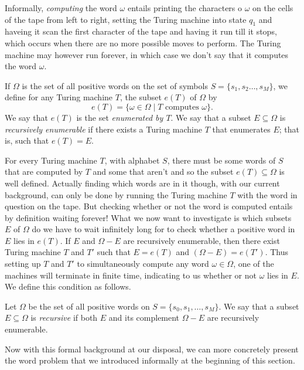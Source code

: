 Informally, \emph{computing} the word $\omega$ entails printing the characters o $\omega$ on the cells of the tape from left to right, setting the Turing machine into state $q_1$ and haveing it scan the first character of the tape and having it run till it stops, which occurs when there are no more possible moves to perform. The Turing machine may however run forever, in which case we don't say that it computes the word $\omega$.

\begin{definition}
  If $\Omega$ is the set of all positive words on the set of symbols $S = \{s_1, s_2 \dots, s_M\}$, we define for any Turing machine $T$, the subset $e(T)$ of $\Omega$ by
  \begin{equation*}
    e(T) = \{\omega \in \Omega \mid T \text{ computes } \omega\}.
  \end{equation*}
  We say that $e(T)$ is the set \emph{enumerated by $T$}. We say that a subset $E \subseteq \Omega$ is \emph{recursively enumerable} if there exists a Turing machine $T$ that enumerates $E$; that is, such that  $e(T) = E$.
\end{definition}

For every Turing machine $T$, with alphabet $S$, there must be some words of $S$ that are computed by $T$ and some that aren't and so the subset $e(T) \subseteq \Omega$ is well defined. Actually finding which words are in it though, with our current background, can only be done by running the Turing machine $T$ with the word in question on the tape. But checking whether or not the word is computed entails by definition waiting forever! What we now want to investigate is which subsets $E$ of $\Omega$ do we have to wait infinitely long for to check whether a positive word in $E$ lies in $e(T)$. If $E$ and $\Omega - E$ are recursively enumerable, then there exist Turing machine $T$ and $T'$ such that $E = e(T)$ and $(\Omega - E) = e(T')$. Thus setting up $T$ and $T'$ to simultaneously compute any word $\omega \in \Omega$, one of the machines will terminate in finite time, indicating to us whether or not $\omega$ lies in $E$. We define this condition as follows.

\begin{definition}
  Let $\Omega$ be the set of all positive words on $S = \{s_0,s_1, \dots, s_M \}$. We say that a subset $E \subseteq \Omega$ is \emph{recursive} if both $E$ and its complement $\Omega - E$ are recursively enumerable.
\end{definition}

Now with this formal background at our disposal, we can more concretely present the word problem that we introduced informally at the beginning of this section.

